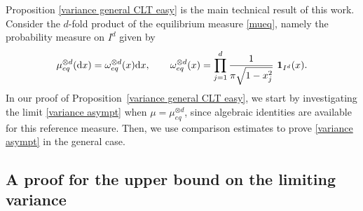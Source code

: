 \documentclass[a4paper,11pt]{article}
\numberwithin{equation}{section}
\theoremstyle{definition}
\newcommand{\eq}{\begin{equation}}
\newcommand{\qe}{\end{equation}}
\newcommand{\N}{\mathbb{N}}
\newcommand{\bs}{\boldsymbol}
\newcommand{\red}{\color{red}}
\renewcommand{\d}{ {\rm d}}
\begin{document}
Proposition \ref{variance general CLT easy} is the main technical result of this work. Consider the $d$-fold product of the equilibrium measure \eqref{mueq}, namely the probability measure on $I^d$ given by
\eq
\label{eq measure d}
\mu_{eq}^{\otimes d}(\d x)=\omega_{eq}^{\otimes d}(x)\d x,\qquad \omega_{eq}^{\otimes d}(x)= \prod_{j=1}^d\frac{1}{\pi\sqrt{1-x_j^2}}\ \bs 1_{I^d}(x).
\qe
In our proof of Proposition~\ref{variance general CLT easy}, we start by
investigating the limit \eqref{variance asympt} when
$\mu=\mu_{eq}^{\otimes d}$, since algebraic identities are available for this
reference measure. Then, we use comparison estimates to prove \eqref{variance asympt} in the general case.









 \subsection{A proof for the upper bound on the limiting variance}
\label{s:boundOnLimitVar}
\end{document}
